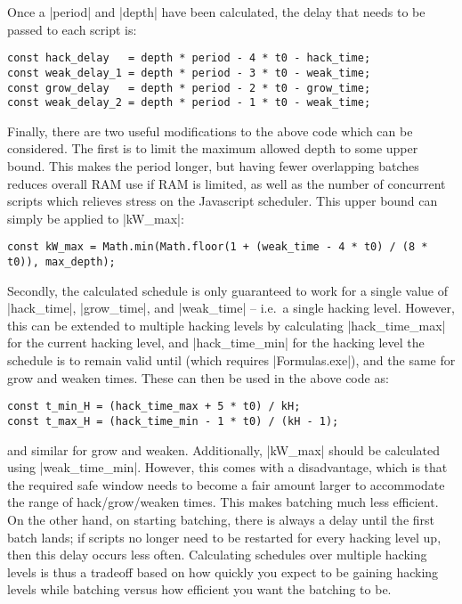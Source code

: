 \documentclass[veryplain]{notes}
\begin{document}
Once a |period| and |depth| have been calculated, the delay that needs to be passed to each script is:
\begin{lstlisting}
const hack_delay   = depth * period - 4 * t0 - hack_time;
const weak_delay_1 = depth * period - 3 * t0 - weak_time;
const grow_delay   = depth * period - 2 * t0 - grow_time;
const weak_delay_2 = depth * period - 1 * t0 - weak_time;
\end{lstlisting}
Finally, there are two useful modifications to the above code which can be considered. The first is to limit the maximum allowed depth to some upper bound. This makes the period longer, but having fewer overlapping batches reduces overall RAM use if RAM is limited, as well as the number of concurrent scripts which relieves stress on the Javascript scheduler. This upper bound can simply be applied to |kW_max|:
\begin{lstlisting}
const kW_max = Math.min(Math.floor(1 + (weak_time - 4 * t0) / (8 * t0)), max_depth);
\end{lstlisting}
Secondly, the calculated schedule is only guaranteed to work for a single value of |hack_time|, |grow_time|, and |weak_time| -- i.e.\ a single hacking level. However, this can be extended to multiple hacking levels by calculating |hack_time_max| for the current hacking level, and |hack_time_min| for the hacking level the schedule is to remain valid until (which requires |Formulas.exe|), and the same for grow and weaken times. These can then be used in the above code as:
\begin{lstlisting}
const t_min_H = (hack_time_max + 5 * t0) / kH;
const t_max_H = (hack_time_min - 1 * t0) / (kH - 1);
\end{lstlisting}
and similar for grow and weaken. Additionally, |kW_max| should be calculated using |weak_time_min|. However, this comes with a disadvantage, which is that the required safe window needs to become a fair amount larger to accommodate the range of hack/grow/weaken times. This makes batching much less efficient. On the other hand, on starting batching, there is always a delay until the first batch lands; if scripts no longer need to be restarted for every hacking level up, then this delay occurs less often. Calculating schedules over multiple hacking levels is thus a tradeoff based on how quickly you expect to be gaining hacking levels while batching versus how efficient you want the batching to be.
\end{document}
